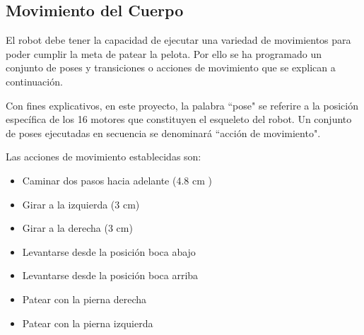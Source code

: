 

\subsection{Movimiento del Cuerpo}\label{esqueleto}

El robot debe tener la capacidad de ejecutar una variedad de movimientos para poder cumplir la meta de patear la pelota. Por ello se ha programado un conjunto de poses y transiciones o acciones de movimiento que se explican a continuación.

Con fines explicativos, en este proyecto, la palabra ``pose" se referire a la posición específica de los 16 motores que constituyen el esqueleto del robot. Un conjunto de poses ejecutadas en secuencia se denominará ``acción de movimiento".

Las acciones de movimiento establecidas son:

\begin{itemize}
 \item {Caminar dos pasos hacia adelante (4.8 cm ) }
 \item {Girar a la izquierda (3 cm)}
 \item {Girar a la derecha (3 cm)}
 \item {Levantarse desde la posición boca abajo}
 \item {Levantarse desde la posición boca arriba}
 \item {Patear con la pierna derecha }
 \item {Patear con la pierna izquierda}
 
\end{itemize}

